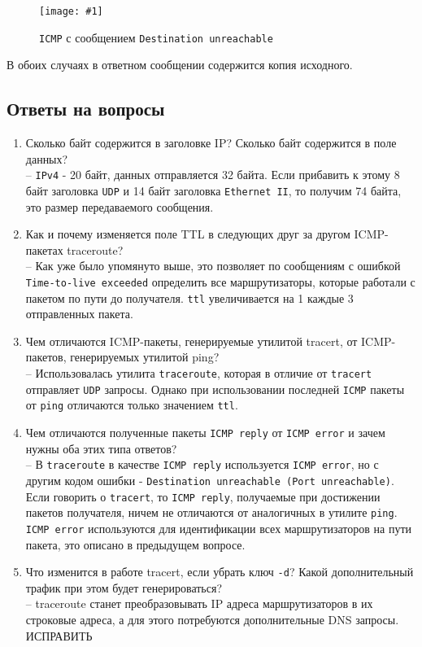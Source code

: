\documentclass[12pt, a4paper]{article}
\newcommand{\figc}[4]{
  \begin{figure}[h]
  \begin{center}
    \texttt{[image: \#1]}
    \caption{#2}
    \label{fig:#3}
  \end{center}
  \end{figure}
}
\begin{document}
\figc{icmp_dest_unreach}{\texttt{ICMP} с сообщением \texttt{Destination unreachable}}{i_d_u}{3.0}

В обоих случаях в ответном сообщении содержится копия исходного.

\newpage

\subsection{Ответы на вопросы}

\begin{enumerate}
  \item Сколько байт содержится в заголовке IP? Сколько байт содержится в поле данных?\\
    -- \texttt{IPv4} - 20 байт, данных отправляется 32 байта. Если прибавить к
    этому 8 байт заголовка \texttt{UDP} и 14 байт заголовка \texttt{Ethernet II},
    то получим 74 байта, это размер передаваемого сообщения.
  \item Как и почему изменяется поле TTL в следующих друг за другом ICMP-пакетах traceroute?\\
    -- Как уже было упомянуто выше, это позволяет по сообщениям с ошибкой
    \texttt{Time-to-live exceeded} определить все маршрутизаторы, которые
    работали с пакетом по пути до получателя. \texttt{ttl} увеличивается на 1
    каждые 3 отправленных пакета.
  \item  Чем отличаются ICMP-пакеты, генерируемые утилитой tracert, от
    ICMP-пакетов, генерируемых утилитой ping?\\
    -- Использовалась утилита \texttt{traceroute}, которая в отличие от
    \texttt{tracert} отправляет \texttt{UDP} запросы. Однако при использовании
    последней \texttt{ICMP} пакеты от \texttt{ping} отличаются только значением
    \texttt{ttl}.
  \item Чем отличаются полученные пакеты \texttt{ICMP reply} от \texttt{ICMP error} и зачем
    нужны оба этих типа ответов?\\
    -- В \texttt{traceroute} в качестве \texttt{ICMP reply} используется
    \texttt{ICMP error}, но с другим кодом ошибки - \texttt{Destination unreachable (Port unreachable)}.
    Если говорить о \texttt{tracert}, то \texttt{ICMP reply}, получаемые при
    достижении пакетов получателя, ничем не отличаются от аналогичных в утилите
    \texttt{ping}. \texttt{ICMP error} используются для идентификации всех
    маршрутизаторов на пути пакета, это описано в предыдущем вопросе.
  \item Что изменится в работе tracert, если убрать ключ \texttt{-d}? Какой
    дополнительный трафик при этом будет генерироваться?\\
    -- traceroute станет преобразовывать IP адреса маршрутизаторов в их строковые
    адреса, а для этого потребуются дополнительные DNS запросы. ИСПРАВИТЬ
\end{enumerate}
\end{document}
